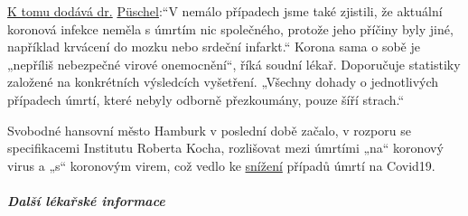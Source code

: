 \href{https://www.abendblatt.de/hamburg/article228828787/rechtsmedizin-pueschel-hamburg-corona-virus-infektion-covid-19-coronavirus-krise-patienten-krankenhaeuser-kliniken-infektionsrate-krankheit-pandemie-test-lungenkrankheit-sars-cov-epidemie-sars-cov-2.html\%20/t\%20_blank}{K
tomu dodává dr.}
\href{https://www.abendblatt.de/hamburg/article228828787/rechtsmedizin-pueschel-hamburg-corona-virus-infektion-covid-19-coronavirus-krise-patienten-krankenhaeuser-kliniken-infektionsrate-krankheit-pandemie-test-lungenkrankheit-sars-cov-epidemie-sars-cov-2.html\%20/t\%20_blank}{Püschel}:``V
nemálo případech jsme také zjistili, že aktuální koronová infekce neměla
s úmrtím nic společného, protože jeho příčiny byly jiné, například
krvácení do mozku nebo srdeční infarkt.`` Korona sama o sobě je
„nepříliš nebezpečné virové onemocnění``, říká soudní lékař. Doporučuje
statistiky založené na konkrétních výsledcích vyšetření. „Všechny dohady
o jednotlivých případech úmrtí, které nebyly odborně přezkoumány, pouze
šíří strach.``

Svobodné hansovní město Hamburk v poslední době začalo, v rozporu se
specifikacemi Institutu Roberta Kocha, rozlišovat mezi úmrtími „na``
koronový virus a „s`` koronovým virem, což vedlo ke
\href{https://www.t-online.de/nachrichten/deutschland/id_87636856/coronavirus-hamburg-will-nur-echte-covid-19-tote-zaehlen.html}{snížení}
případů úmrtí na Covid19.

\hypertarget{dalux161uxed-luxe9kaux159skuxe9-informace}{%
\subparagraph{\texorpdfstring{\textbf{Další lékařské
informace}}{Další lékařské informace}}\label{dalux161uxed-luxe9kaux159skuxe9-informace}}

